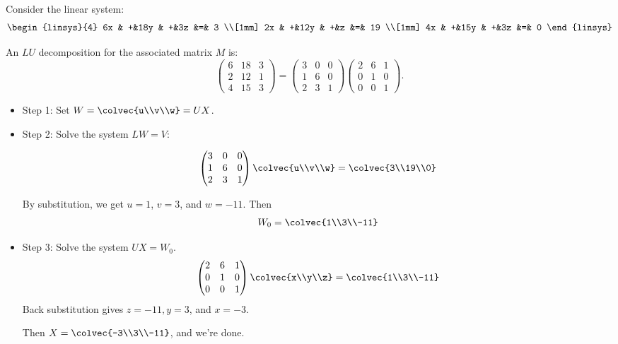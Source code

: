 
\begin{example}
Consider the linear system:
\[
      \begin{linsys}{4}
            6x & +&18y & +&3z         &=& 3  \\[1mm]
            2x & +&12y & +&z	    &=& 19 \\[1mm]
            4x & +&15y & +&3z         &=& 0  
      \end{linsys}
\]

An $LU$ decomposition for the associated matrix $M$ is:
\[
\begin{pmatrix}
6 & 18 & 3 \\
2 & 12 & 1 \\
4 & 15 & 3 
\end{pmatrix} =
\begin{pmatrix}
3 & 0 & 0 \\
1 & 6 & 0 \\
2 & 3 & 1 
\end{pmatrix}
\begin{pmatrix}
2 & 6 & 1 \\
0 & 1 & 0 \\
0 & 0 & 1 
\end{pmatrix}.
\]

\begin{itemize}
\item{Step 1:} \hypertarget{LUproc}{Set} $W=\colvec{u\\v\\w}=UX$.  

\item{Step 2:} Solve the system $LW=V$:

\[
\begin{pmatrix}
3 & 0 & 0 \\
1 & 6 & 0 \\
2 & 3 & 1 
\end{pmatrix}
\colvec{u\\v\\w} =
\colvec{3\\19\\0}
\]

By substitution, we get $u=1$, $v=3$, and $w=-11$.  Then 
\[W_0=\colvec{1\\3\\-11}\]

\item{Step 3:} Solve the system $UX=W_0$.  
\[
\begin{pmatrix}
2 & 6 & 1 \\
0 & 1 & 0 \\
0 & 0 & 1 
\end{pmatrix}
\colvec{x\\y\\z} =
\colvec{1\\3\\-11}
\]
Back substitution gives $z=-11, y=3$, and $x=-3$.  

Then $X=\colvec{-3\\3\\-11}$, and we're done.
\end{itemize}
\end{example}

